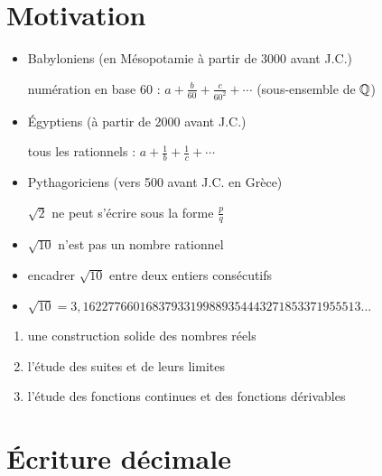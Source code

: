 \section*{Motivation}
\begin{frame}


\begin{itemize}
 \item Babyloniens (en Mésopotamie à partir de 3000 avant J.C.)
\pause

 numération en base $60$ : $a+\frac{b}{60} + \frac{c}{60^2}+ \cdots$
 (sous-ensemble de $\mathbb{Q}$)

 \pause

 \item Égyptiens (à partir de 2000 avant J.C.)
\pause

 tous les rationnels : $a+\frac{1}{b} + \frac{1}{c}+ \cdots$

 \pause

 \item Pythagoriciens (vers 500 avant J.C. en Grèce)

 \pause

 $\sqrt2$ ne peut s'écrire sous la forme $\frac pq$

  \pause

 \item $\sqrt{10}$  \pause  n'est pas un nombre rationnel

  \pause

  \item encadrer $\sqrt{10}$ entre deux entiers consécutifs

  \pause

  \item $\sqrt{10} = 3,16227766016837933199889354443271853371955513\ldots$
\end{itemize}

 \pause

\begin{enumerate}
  \item une construction solide des nombres réels

  \item l'étude des suites et de leurs limites

  \item l'étude des fonctions continues et des fonctions dérivables
\end{enumerate}


\end{frame}



\section*{\'Ecriture décimale}

